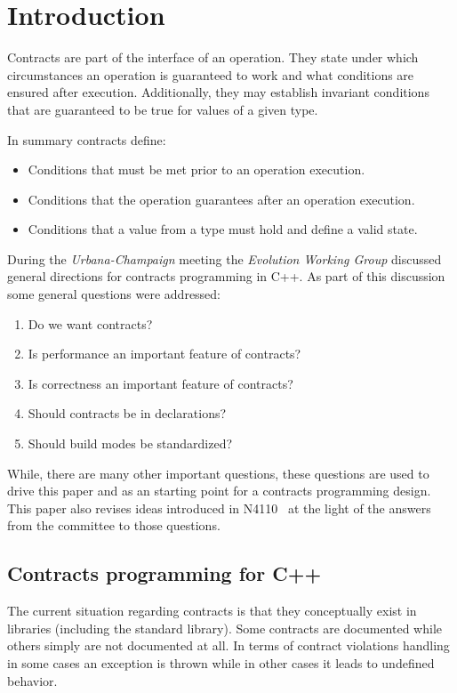 \section{Introduction}

Contracts are part of the interface of an operation. They state under which
circumstances an operation is guaranteed to work and what conditions are
ensured after execution. Additionally, they may establish invariant conditions
that are guaranteed to be true for values of a given type.

In summary contracts define:

\begin{itemize}
\item Conditions that must be met prior to an operation execution.
\item Conditions that the operation guarantees after an operation execution.
\item Conditions that a value from a type must hold and define a valid state.
\end{itemize}

During the \emph{Urbana-Champaign} meeting the \emph{Evolution Working Group} discussed
general directions for contracts programming in C++. As part of this discussion
some general questions were addressed:

\begin{enumerate}
\item Do we want contracts?
\item Is performance an important feature of contracts?
\item Is correctness an important feature of contracts?
\item Should contracts be in declarations?
\item Should build modes be standardized?
\end{enumerate}

While, there are many other important questions, these questions are used to
drive this paper and as an starting point for a contracts programming design.
This paper also revises ideas introduced in N4110~\cite{n4110} at the light of
the answers from the committee to those questions.

\subsection{Contracts programming for C++}

The current situation regarding contracts is that they conceptually exist in
libraries (including the standard library). Some contracts are documented while
others simply are not documented at all. In terms of contract violations
handling in some cases an exception is thrown while in other cases it leads to
undefined behavior.

